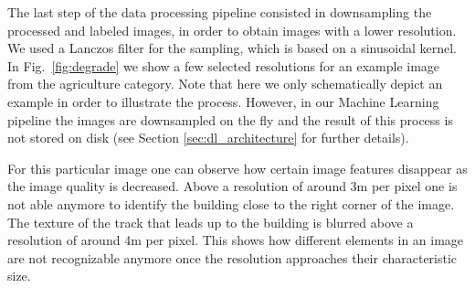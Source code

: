 The last step of the data processing pipeline consisted in downsampling the processed and labeled images, in order to obtain images with a lower resolution. We used a Lanczos filter \parencite{duchon1979} for the sampling, which is based on a sinusoidal kernel. In Fig.~\ref{fig:degrade} we show a few selected resolutions for an example image from the agriculture category. Note that here we only schematically depict an example in order to illustrate the process. However, in our Machine Learning pipeline the images are downsampled on the fly and the result of this process is not stored on disk (see Section \ref{sec:dl_architecture} for further details).

For this particular image one can observe how certain image features disappear as the image quality is decreased. Above a resolution of around 3m per pixel one is not able anymore to identify the building close to the right corner of the image. 
The texture of the track that leads up to the building is blurred above a resolution of around 4m per pixel. This shows how different elements in an image are not recognizable anymore once the resolution approaches their characteristic size.



